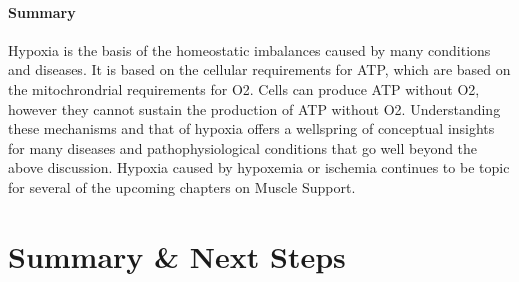 \paragraph{Summary}
Hypoxia is the basis of the homeostatic imbalances caused by many conditions and diseases. It is based on the cellular requirements for ATP, which are based on the mitochrondrial requirements for O2. Cells can produce ATP without O2, however they cannot sustain the production of ATP without O2. Understanding these mechanisms and that of hypoxia offers a wellspring of conceptual insights for many diseases and pathophysiological conditions that go well beyond the above discussion. Hypoxia caused by hypoxemia or ischemia continues to be topic for several of the upcoming chapters on Muscle Support.



\section{Summary \& Next Steps}




\printbibliography[heading=subbibintoc]